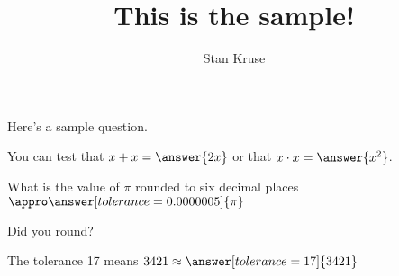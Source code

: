 \documentclass{ximera}
\title{This is the sample!}
\author{Stan Kruse}
\begin{document}
\maketitle

Here's a sample question.

\begin{problem}
\begin{multipleChoice}
\end{multipleChoice}
\end{problem}

\begin{problem}
   You can test that $x + x = \answer{2x}$ or that $x \cdot x = \answer{x^2}$.
    \begin{problem}
    What is the value of $\pi$ rounded to six decimal places $\appro \answer[tolerance=0.0000005]{\pi}$
        \begin{hint}
        Did you round?
        \end{hint}
    \end{problem}
\end{problem}



\begin{problem}
   The tolerance 17 means $3421 \approx \answer[tolerance=17]{3421}$
\end{problem}
\end{document}
